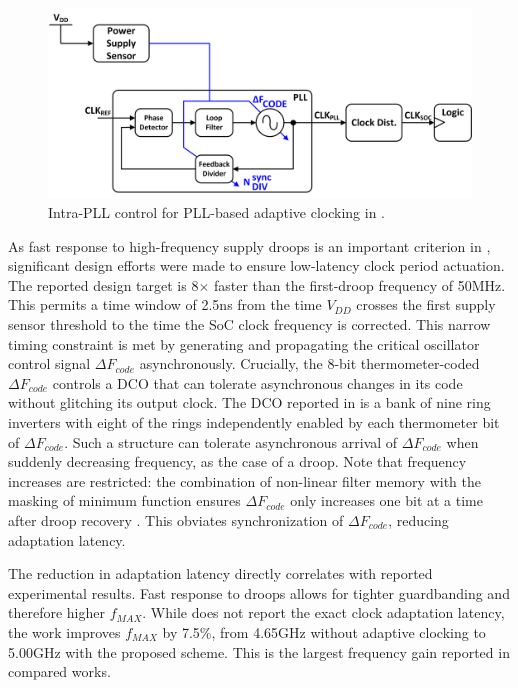 \documentclass[twoside,9pt,journal,letterpage]{IEEEtran}
\begin{document}
\begin{figure}[h]
	\centering
	\includegraphics[width=\columnwidth]{fig_detail_pllarch}
	\caption{Intra-PLL control for PLL-based adaptive clocking in \cite{hashimoto2018}.}
	\label{fig:detail_pllarch}
\end{figure}

As fast response to high-frequency supply droops is an important criterion in \cite{hashimoto2018}, significant design efforts were made to ensure low-latency clock period actuation. The reported design target is 8$\times$ faster than the first-droop frequency of 50MHz. This permits a time window of 2.5ns from the time $V_{DD}$ crosses the first supply sensor threshold to the time the SoC clock frequency is corrected. This narrow timing constraint is met by generating and propagating the critical oscillator control signal $\Delta F_{code}$ asynchronously. Crucially, the 8-bit thermometer-coded $\Delta F_{code}$ controls a DCO that can tolerate asynchronous changes in its code without glitching its output clock. The DCO reported in \cite{hashimoto2018} is a bank of nine ring inverters with eight of the rings independently enabled by each thermometer bit of $\Delta F_{code}$. Such a structure can tolerate asynchronous arrival of $\Delta F_{code}$ when suddenly decreasing frequency, as the case of a droop. Note that frequency increases are restricted: the combination of non-linear filter memory with the masking of minimum function ensures $\Delta F_{code}$ only increases one bit at a time after droop recovery \cite{hashimoto2018}. This obviates synchronization of $\Delta F_{code}$, reducing adaptation latency.

The reduction in adaptation latency directly correlates with reported experimental results. Fast response to droops allows for tighter guardbanding and therefore higher $f_{MAX}$. While \cite{hashimoto2018} does not report the exact clock adaptation latency, the work improves $f_{MAX}$ by 7.5\%, from 4.65GHz without adaptive clocking to 5.00GHz with the proposed scheme. This is the largest frequency gain reported in compared works.
\end{document}

